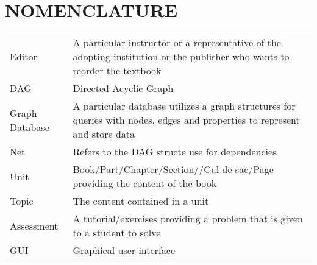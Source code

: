 %
%
%
%


\chapter*{NOMENCLATURE}

\vspace{-0.5in}
	\begin{table}[htbp]
	    \begin{tabular}{@{}p{} p{}@{}}
		Editor & A particular instructor or a representative of the adopting institution or the publisher who wants to reorder the textbook\\	[2ex]
		DAG & Directed Acyclic Graph \\ [2ex]
		Graph Database & A particular database utilizes a graph structures for queries with nodes, edges and properties to represent and store data \\ [2ex]
		Net & Refers to the DAG structe use for dependencies \\ [2ex]
		Unit & Book/Part/Chapter/Section//Cul-de-sac/Page providing the content of the book \\ [2ex]
		Topic & The content contained in a unit \\ [2ex]
		Assessment & A tutorial/exercises providing a problem that is given to a student to solve \\ [2ex]
		GUI & Graphical user interface \\ [2ex]
	    \end{tabular}
	\end{table}

\pagebreak{}
